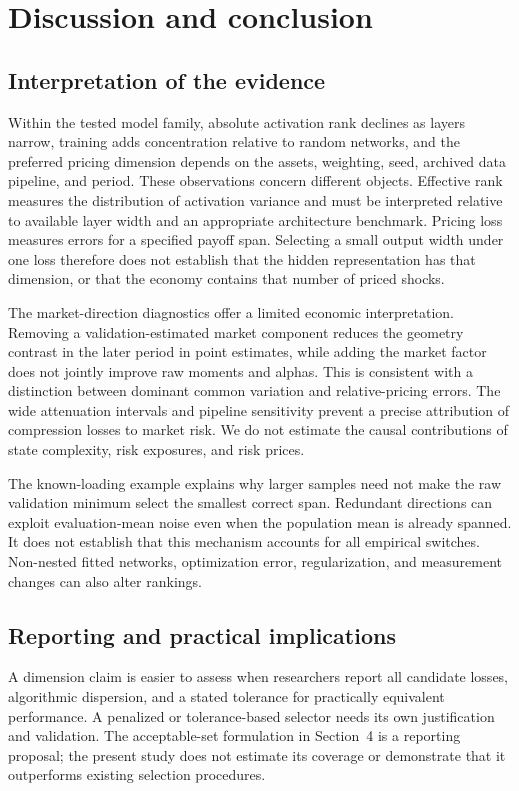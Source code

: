 \section{Discussion and conclusion}

\subsection{Interpretation of the evidence}

Within the tested model family, absolute activation rank declines as layers narrow, training adds concentration relative to random networks, and the preferred pricing dimension depends on the assets, weighting, seed, archived data pipeline, and period. These observations concern different objects. Effective rank measures the distribution of activation variance and must be interpreted relative to available layer width and an appropriate architecture benchmark. Pricing loss measures errors for a specified payoff span. Selecting a small output width under one loss therefore does not establish that the hidden representation has that dimension, or that the economy contains that number of priced shocks.

The market-direction diagnostics offer a limited economic interpretation. Removing a validation-estimated market component reduces the geometry contrast in the later period in point estimates, while adding the market factor does not jointly improve raw moments and alphas. This is consistent with a distinction between dominant common variation and relative-pricing errors. The wide attenuation intervals and pipeline sensitivity prevent a precise attribution of compression losses to market risk. We do not estimate the causal contributions of state complexity, risk exposures, and risk prices.

The known-loading example explains why larger samples need not make the raw validation minimum select the smallest correct span. Redundant directions can exploit evaluation-mean noise even when the population mean is already spanned. It does not establish that this mechanism accounts for all empirical switches. Non-nested fitted networks, optimization error, regularization, and measurement changes can also alter rankings.

\subsection{Reporting and practical implications}

A dimension claim is easier to assess when researchers report all candidate losses, algorithmic dispersion, and a stated tolerance for practically equivalent performance. A penalized or tolerance-based selector needs its own justification and validation. The acceptable-set formulation in Section~4 is a reporting proposal; the present study does not estimate its coverage or demonstrate that it outperforms existing selection procedures.

